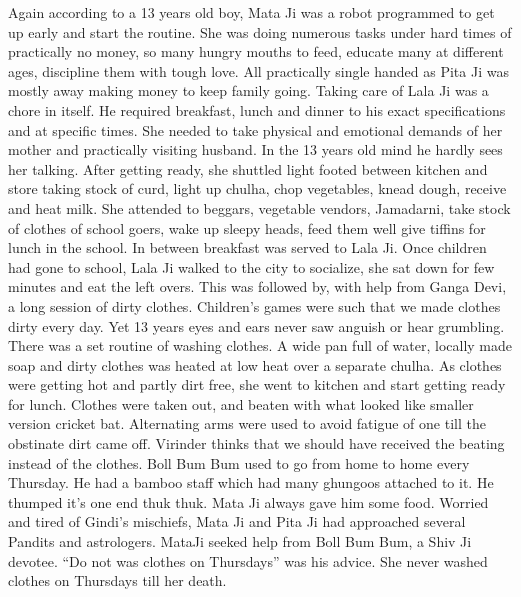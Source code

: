 Again according to a 13 years old boy, Mata Ji was a robot programmed to get up early and start the routine. She was doing numerous tasks under hard times of practically no money, so many hungry mouths to feed, educate many at different ages, discipline them with tough love. All practically single handed as Pita Ji was mostly away making money to keep family going. Taking care of Lala Ji was a chore in itself. He required breakfast, lunch and dinner to his exact specifications and at specific times. She needed to take physical and emotional demands of her mother and practically visiting husband. In the 13 years old mind he hardly sees her talking. After getting ready, she shuttled light footed between kitchen and store taking stock of curd, light up chulha, chop vegetables, knead dough, receive and heat milk. She attended to beggars, vegetable vendors, Jamadarni, take stock of clothes of school goers, wake up sleepy heads, feed them well give tiffins for lunch in the school. In between breakfast was served to Lala Ji. Once children had gone to school, Lala Ji walked to the city to socialize, she sat down for few minutes and eat the left overs. This was followed by, with help from Ganga Devi, a long session of dirty clothes. Children’s games were such that we made clothes dirty every day. Yet 13 years eyes and ears never saw anguish or hear grumbling. There was a set routine of washing clothes. A wide pan full of water, locally made soap and dirty clothes was heated at low heat over a separate chulha. As clothes were getting hot and partly dirt free, she went to kitchen and start getting ready for lunch. Clothes were taken out, and beaten with what looked like smaller version
cricket bat. Alternating arms were used to avoid fatigue of one till the obstinate dirt came off. Virinder thinks that we should have received the beating instead of the clothes. Boll Bum Bum used to go from home to home every Thursday. He had a bamboo staff which had many ghungoos attached to it. He thumped it’s one end thuk thuk. Mata Ji always gave him some food. Worried and tired of Gindi’s mischiefs, Mata Ji and Pita Ji had approached several Pandits and astrologers. MataJi seeked help from Boll Bum Bum, a Shiv Ji devotee. “Do not was clothes on Thursdays” was his advice. She never washed clothes on Thursdays till her death. 

